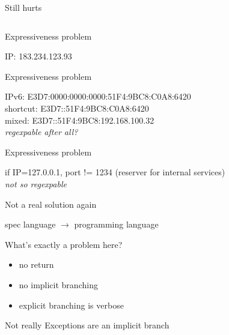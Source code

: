 \documentclass[10pt]{beamer}
\newcommand{\code}[4]{\inputminted[linenos, frame=none, firstline=#2, lastline=#3,
  framesep=10pt, bgcolor=lightgray]{#4}{#1}}
\begin{document}
\begin{frame}{Still hurts}
  \code{code.erl}{39}{46}{erlang}
\end{frame}

\begin{frame}{Expressiveness problem}
  \begin{center}
    \large
    IP: 183.234.123.93
  \end{center}
\end{frame}

\begin{frame}{Expressiveness problem}
  \begin{center}
    \large
    IPv6: E3D7:0000:0000:0000:51F4:9BC8:C0A8:6420\\
    shortcut: E3D7::51F4:9BC8:C0A8:6420\\
    mixed: E3D7::51F4:9BC8:192.168.100.32\\
    \emph{regexpable after all?}
  \end{center}
\end{frame}

\begin{frame}{Expressiveness problem}
  \begin{center}
    \large
    if IP=127.0.0.1, port != 1234 (reserver for internal services)\\
    \emph{not so regexpable}
  \end{center}
\end{frame}

\begin{frame}{Not a real solution again}
  \begin{center}
    \Large
    spec language $\rightarrow$ programming language
  \end{center}
\end{frame}

\begin{frame}{What's exactly a problem here?}
  \begin{itemize}
  \item no return
  \item no implicit branching
  \item explicit branching is verbose
  \end{itemize}
\end{frame}

\begin{frame}{Not really}
  Exceptions are an implicit branch
  \code{code.erl}{48}{50}{erlang}
\end{frame}
\end{document}
